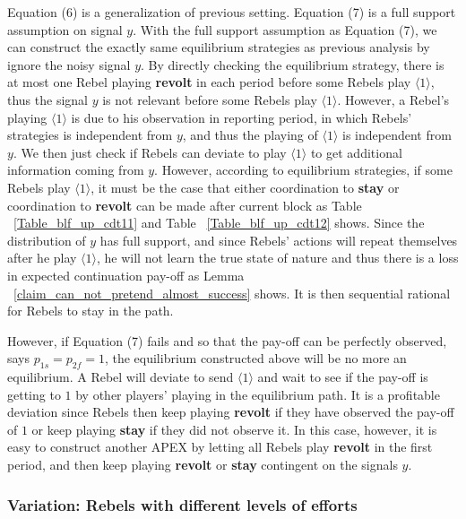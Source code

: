 \documentclass[12pt,letter]{article}
\theoremstyle{definition}
\theoremstyle{remark}
\theoremstyle{claim}
\begin{document}
Equation (6) is a generalization of previous setting. Equation (7) is a full support assumption on signal $y$. With the full support assumption as Equation (7), we can construct the exactly same equilibrium strategies as previous analysis by ignore the noisy signal $y$. By directly checking the equilibrium strategy, there is at most one Rebel playing \textbf{revolt} in each period before some Rebels play $\langle 1 \rangle$, thus the signal $y$ is not relevant before some Rebels play $\langle 1 \rangle$. However, a Rebel's playing $\langle 1 \rangle$ is due to his observation in reporting period, in which Rebels' strategies is independent from $y$, and thus the playing of $\langle 1 \rangle$ is independent from $y$. We then just check if Rebels can deviate to play $\langle 1 \rangle$ to get additional information coming from $y$. However, according to equilibrium strategies, if some Rebels play $\langle 1 \rangle$, it must be the case that either coordination to \textbf{stay} or coordination to \textbf{revolt} can be made after current block as Table ~\ref{Table_blf_up_cdt11} and Table ~\ref{Table_blf_up_cdt12} shows. Since the distribution of $y$ has full support, and since Rebels' actions will repeat themselves after he play $\langle 1 \rangle$, he will not learn the true state of nature and thus there is a loss in expected continuation pay-off as Lemma ~\ref{claim_can_not_pretend_almost_success} shows. It is then sequential rational for Rebels to stay in the path.

However, if Equation (7) fails and so that the pay-off can be perfectly observed, says $p_{1s}=p_{2f}=1$, the equilibrium constructed above will be no more an equilibrium. A Rebel will deviate to send $\langle 1 \rangle$ and wait to see if the pay-off is getting to $1$ by other players' playing in the equilibrium path. It is a profitable deviation since Rebels then keep playing \textbf{revolt} if they have observed the pay-off of $1$ or keep playing \textbf{stay} if they did not observe it. In this case, however, it is easy to construct another APEX by letting all Rebels play \textbf{revolt} in the first period, and then keep playing \textbf{revolt} or \textbf{stay} contingent on the signals $y$.

\subsubsection{Variation: Rebels with different levels of efforts}
\end{document}
